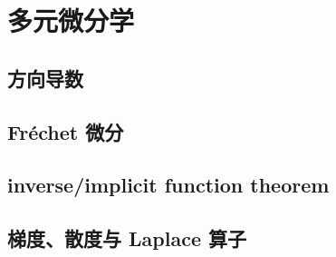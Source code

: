 \section{多元微分学}
\label{b2:sec:0101}


\subsection{方向导数}
\label{b2:subsec:010101}

\subsection{Fréchet 微分}
\label{b2:subsec:010102}

\subsection{inverse/implicit function theorem}
\label{b2:subsec:010103}

\subsection{梯度、散度与 Laplace 算子}
\label{b2:subsec:010104}


